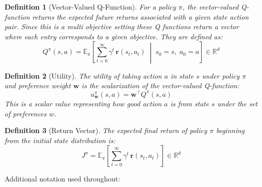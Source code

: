 \documentclass[11pt]{article}
\newtheorem{definition}{Definition}
\begin{document}
\begin{definition}[Vector-Valued Q-Function]
For a policy $\pi$, the vector-valued Q-function returns the expected future returns associated with a given state action pair. Since this is a multi objective setting these Q functions return a vector where each entry corresponds to a given objective. They are defined as:
\begin{equation}
    Q^{\pi}(s, a) = \mathbb{E}_{\pi}\!\left[\sum_{t=0}^{\infty} \gamma^t \, \mathbf{r}(s_t, a_t) \;\middle|\; s_0 = s,\; a_0 = a\right] \in \mathbb{R}^d
\end{equation}
\end{definition}

\begin{definition}[Utility]
The utility of taking action $a$ in state $s$ under policy $\pi$ and preference weight $\mathbf{w}$ is the scalarization of the vector-valued Q-function:
\begin{equation}
    u_{\mathbf{w}}^{\pi}(s, a) = \mathbf{w}^\top Q^{\pi}(s, a)
\end{equation}
This is a scalar value representing how good action $a$ is from state $s$ under the set of preferences $w$.
\end{definition}

\begin{definition}[Return Vector]
The expected final return of policy $\pi$ beginning from the initial state distribution is:
\begin{equation}
    J^{\pi} = \mathbb{E}_{\pi}\!\left[\sum_{t=0}^{\infty} \gamma^t \, \mathbf{r}(s_t, a_t)\right] \in \mathbb{R}^d
\end{equation}
\end{definition}

Additional notation used throughout:
\end{document}

